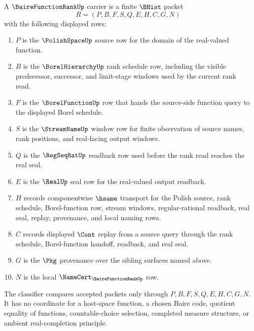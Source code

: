 \begin{definition}
\label{def:baire-function-rank-carrier}
A $\BaireFunctionRankUp$ carrier is a finite $\BHist$ packet
$$
R=(P,B,F,S,Q,E,H,C,G,N)
$$
with the following displayed rows:
\begin{enumerate}
\item $P$ is the $\PolishSpaceUp$ source row for the domain of the real-valued function.
\item $B$ is the $\BorelHierarchyUp$ rank schedule row, including the visible predecessor, successor, and limit-stage windows used by the current rank read.
\item $F$ is the $\BorelFunctionUp$ row that hands the source-side function query to the displayed Borel schedule.
\item $S$ is the $\StreamNameUp$ window row for finite observation of source names, rank positions, and real-facing output windows.
\item $Q$ is the $\RegSeqRatUp$ readback row used before the rank read reaches the real seal.
\item $E$ is the $\RealUp$ seal row for the real-valued output readback.
\item $H$ records componentwise $\hsame$ transport for the Polish source, rank schedule, Borel-function row, stream windows, regular-rational readback, real seal, replay, provenance, and local naming rows.
\item $C$ records displayed $\Cont$ replay from a source query through the rank schedule, Borel-function handoff, readback, and real seal.
\item $G$ is the $\Pkg$ provenance over the sibling surfaces named above.
\item $N$ is the local $\NameCert_{\BaireFunctionRankUp}$ row.
\end{enumerate}
The classifier compares accepted packets only through $P,B,F,S,Q,E,H,C,G,N$. It has no coordinate for a host-space function, a chosen Baire code, quotient equality of functions, countable-choice selection, completed measure structure, or ambient real-completion principle.
\end{definition}

